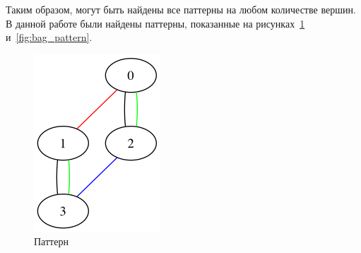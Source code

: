Таким образом, могут быть найдены все паттерны на любом количестве вершин.
В данной работе были найдены паттерны, показанные на рисунках~\ref{fig:cylinder_pattern} и~\ref{fig:bag_pattern}.
\begin{figure}[H]
  \centering
  \includegraphics[max width=\linewidth]{fig/2/patterns/cylinder.png}
    \caption{Паттерн }
    \label{fig:cylinder_pattern}
  \endminipage \hspace{1em}

\end{figure}
